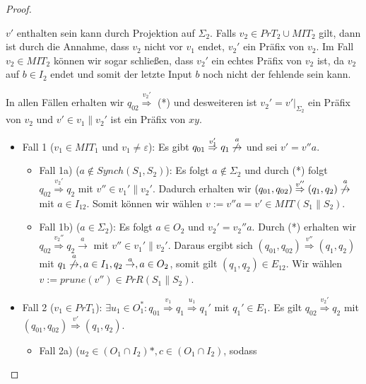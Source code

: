 \begin{proof}
\begin{itemize}
      $v'$ enthalten sein kann durch Projektion auf $\Sigma _2$. Falls $v_2\in
      PrT_2\cup MIT_2$ gilt, dann ist durch die Annahme, dass $v_2$ nicht vor
      $v_1$ endet, $v_2'$ ein Präfix von $v_2$. Im Fall $v_2\in MIT_2$ können
      wir sogar schließen, dass $v_2'$ ein echtes Präfix von $v_2$ ist, da
      $v_2$ auf $b\in I_2$ endet und somit der letzte Input $b$ noch nicht der
      fehlende sein kann.
  \end{itemize}
  In allen Fällen erhalten wir $q_{02}\overset{v_2'}{\Rightarrow}$ (*) und
  desweiteren ist $v_2'=v'|_{\Sigma _2}$ ein Präfix von $v_2$ und $v'\in v_1\|
  v_2'$ ist ein Präfix von $xy$.
  \begin{itemize}
    \item Fall 1 ($v_1\in MIT_1$ und $v_1\neq\varepsilon$): Es gibt $q_{01}
      \overset{v_1'}{\Rightarrow}q_1
      \overset{a}{\not{\hspace{-0.1cm}\rightarrow}}$ und sei $v'=v''a$.
      \begin{itemize}
        \item Fall 1a) ($a\notin Synch(S_1,S_2)$): Es folgt $a\notin
          \Sigma _2$ und durch (*) folgt $q_{02} \overset{v_2'}{\Rightarrow}
          q_2$ mit $v''\in v_1'\|v_2'$. Dadurch erhalten
          wir $(q_{01},q_{02}) \overset{v''}{\Rightarrow} (q_1,q_2)
          \overset{a}{\not{\hspace{-0.1cm}\rightarrow}}$ mit $a\in I_{12}$.
          Somit können wir wählen $v:=v''a=v'\in MIT(S_1\|S_2)$.
        \item Fall 1b) ($a\in\Sigma _2$): Es folgt $a\in O_2$ und
          $v_2'=v_2''a$. Durch (*) erhalten wir $q_{02}
          \overset{v_2''}{\Rightarrow} q_2 \overset{a}{\rightarrow}$ mit
          $v''\in v_1'\|v_2'$. Daraus ergibt sich $(q_{01},q_{02})
          \overset{v''}{\Rightarrow} (q_1,q_2)$ mit $q_1
          \overset{a}{\not{\hspace{-0.1cm}\rightarrow}},a\in I_1, q_2
          \overset{a}{\rightarrow},a\in O_2$, somit gilt $(q_1,q_2)\in
          E_{12}$. Wir wählen $v:=prune(v'')\in PrR(S_1\|S_2)$.
      \end{itemize}
  \item Fall 2 ($v_1\in PrT_1$): $\exists u_1\in O_1^*:q_{01}
    \overset{v_1}{\Rightarrow} q_1 \overset{u_1}{\Rightarrow} q_1'$ mit
    $q_1'\in E_1$. Es gilt $q_{02} \overset{v_2'}{\Rightarrow}q_2$ mit
    $(q_{01},q_{02}) \overset{v'}{\Rightarrow}(q_1,q_2)$.
    \begin{itemize}
      \item Fall 2a) ($u_2\in (O_1\cap I_2)*, c\in (O_1\cap I_2)$, sodass

\end{itemize}
\end{itemize}
\end{proof}
